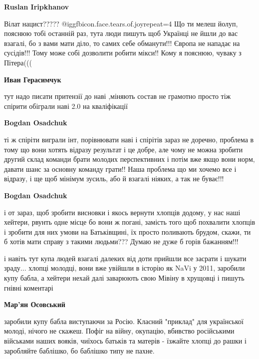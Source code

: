\begin{itemize}
\begin{itemize}
\begin{itemize}
\textbf{Ruslan Iripkhanov} 

Вілат нацист????? @igg{fbicon.face.tears.of.joy}{repeat=4}  Що ти мелеш йолуп, пояснюю тобі останній раз, тута
люди пишуть щоб Українці не йшли до вас взагалі, бо з вами мати діло, то самих
себе обманути!!! Європа не нападає на сусідів!!! Тому може собі дозволити
робити мікси!! Кому я пояснюю, чуваку з Пітера(((

\end{itemize} %

\textbf{Иван Герасимчук} 

тут надо писати притензії до наві ,міняють состав не грамотно просто тіж
спірити обіграли наві 2.0 на кваліфікації

\begin{itemize} %
\textbf{Bogdan Osadchuk} 

ті ж спіріти виграли інт, порівнювати наві і спірітів зараз не доречно,
проблема в тому що вони хотять відразу результат і це добре, але чому не можна
зробити другий склад команди брати молодих перспективних і потім вже якщо вони
норм, давати шанс за основну команду грати!! Наша проблема що ми хочемо все і
відразу, і ще щоб мінімум зусиль, або й взагалі ніяких, а так не буває!!!

\textbf{Bogdan Osadchuk} 

і от зараз, щоб зробити висновки і якось вернути хлопців додому, у нас наші
хейтери, рвунть одне місце бо вони ж погані, замість того щоб похвалити хлопців
і зробити для них умови на Батьківщині, їх просто поливають брудом, скажи, ти б
хотів мати справу з такими людьми??? Думаю не дуже б горів бажанням!!!

\end{itemize} %

\end{itemize} %


і навіть тут купа людей взагалі далеких від доти прийшли все засрати і шукати
зраду... хлопці молодці, вони вже увійшли в історію як NaVi у 2011, заробили
купу бабла, а хейтери нехай далі заварюють свою Мівіну в хрущовці і пишуть
гнівні коментарі

\begin{itemize} %
\textbf{Мар'ян Осовський} 

заробили купу бабла виступаючи за Росію. Класний "приклад" для української
молоді, нічого не скажеш. Пофіг на війну, окупацію, вбивство російськими
військами наших вояків, чиїхось батьків та матерів - їзжайте хлопці до рашки і
заробляйте баблішко, бо баблішко типу не пахне.


\end{itemize}
\end{itemize}
